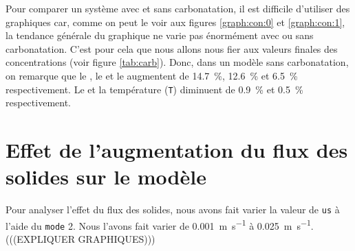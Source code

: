 \documentclass[11pt]{report}
\begin{document}
            \par
            Pour comparer un système avec et sans carbonatation,
            il est difficile d'utiliser des graphiques car,
            comme on peut le voir aux figures \ref{graph:con:0} et \ref{graph:con:1},
            la tendance générale du graphique ne varie pas énormément avec ou sans carbonatation.
            C'est pour cela que nous allons nous fier aux valeurs finales des concentrations (voir figure \ref{tab:carb}).
            Donc, dans un modèle sans carbonatation, on remarque que le , le 
            et le  augmentent de \SI{14.7}{\percent}, \SI{12.6}{\percent} et \SI{6.5}{\percent} respectivement.
            Le  et la température (\verb|T|) diminuent de \SI{0.9}{\percent} et \SI{0.5}{\percent} respectivement.
        \section{Effet de l'augmentation du flux des solides sur le modèle}
            Pour analyser l'effet du flux des solides,
            nous avons fait varier la valeur de \verb|us| à l'aide du \verb|mode| 2.
            Nous l'avons fait varier de \SI{0.001}{\meter\per\second} à \SI{0.025}{\meter\per\second}.
            (((EXPLIQUER GRAPHIQUES)))
\end{document}
